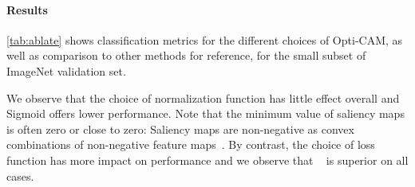 
\paragraph{Results}

\autoref{tab:ablate} shows classification metrics for the different choices of Opti-CAM, as well as comparison to other methods for reference, for the small subset of ImageNet validation set.

We observe that the choice of normalization function has little effect overall and Sigmoid offers lower performance. Note that the minimum value of saliency maps is often zero or close to zero: Saliency maps are non-negative as convex combinations of non-negative feature maps~. By contrast, the choice of loss function has more impact on performance and we observe that \Fdef~ is superior on all cases.

